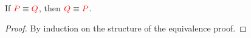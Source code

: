 \begin{theorem}[Symmetry]\label{thm:nc-symmetry}
  If $\textcolor{red}{P} \equiv \textcolor{red}{Q}$, then $\textcolor{red}{Q} \equiv \textcolor{red}{P}$.
\end{theorem}
\begin{proof}
  By induction on the structure of the equivalence proof.
\end{proof}
